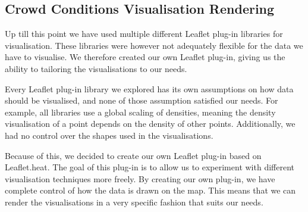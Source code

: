 \subsection{Crowd Conditions Visualisation Rendering}\label{sec:own_leaflet_plugin}

Up till this point we have used multiple different Leaflet plug-in libraries for visualisation. These libraries were however not adequately flexible for the data we have to visualise. We therefore created our own Leaflet plug-in, giving us the ability to tailoring the visualisations to our needs.

Every Leaflet plug-in library we explored has its own assumptions on how data should be visualised, and none of those assumption satisfied our needs. For example, all libraries use a global scaling of densities, meaning the density visualisation of a point depends on the density of other points. Additionally, we had no control over the shapes used in the visualisations.

Because of this, we decided to create our own Leaflet plug-in based on Leaflet.heat. The goal of this plug-in is to allow us to experiment with different visualisation techniques more freely. By creating our own plug-in, we have complete control of how the data is drawn on the map. This means that we can render the visualisations in a very specific fashion that suits our needs.